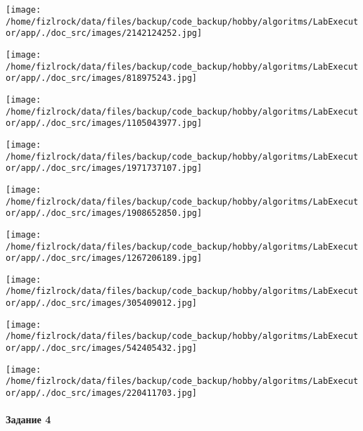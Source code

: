 \documentclass[a4paper, 12pt]{article}
\begin{document}
\texttt{[image: /home/fizlrock/data/files/backup/code\_backup/hobby/algoritms/LabExecutor/app/./doc\_src/images/2142124252.jpg]}

\texttt{[image: /home/fizlrock/data/files/backup/code\_backup/hobby/algoritms/LabExecutor/app/./doc\_src/images/818975243.jpg]}

\texttt{[image: /home/fizlrock/data/files/backup/code\_backup/hobby/algoritms/LabExecutor/app/./doc\_src/images/1105043977.jpg]}

\texttt{[image: /home/fizlrock/data/files/backup/code\_backup/hobby/algoritms/LabExecutor/app/./doc\_src/images/1971737107.jpg]}

\texttt{[image: /home/fizlrock/data/files/backup/code\_backup/hobby/algoritms/LabExecutor/app/./doc\_src/images/1908652850.jpg]}

\texttt{[image: /home/fizlrock/data/files/backup/code\_backup/hobby/algoritms/LabExecutor/app/./doc\_src/images/1267206189.jpg]}

\texttt{[image: /home/fizlrock/data/files/backup/code\_backup/hobby/algoritms/LabExecutor/app/./doc\_src/images/305409012.jpg]}

\texttt{[image: /home/fizlrock/data/files/backup/code\_backup/hobby/algoritms/LabExecutor/app/./doc\_src/images/542405432.jpg]}

\texttt{[image: /home/fizlrock/data/files/backup/code\_backup/hobby/algoritms/LabExecutor/app/./doc\_src/images/220411703.jpg]}
\pagebreak
\paragraph{Задание 4}
\end{document}
